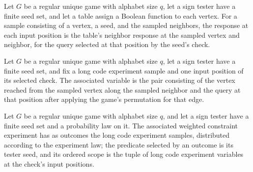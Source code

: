 \begin{definition}
\label{FABL.RegularUniqueGame.longCodeExperimentResponses}
\leanok
{}
Let $G$ be a regular unique game with alphabet size $q$, let a sign tester have a finite
seed set, and let a table assign a Boolean function to each vertex. For a sample
consisting of a vertex, a seed, and the sampled neighbors, the response at each input
position is the table's neighbor response at the sampled vertex and neighbor, for the
query selected at that position by the seed's check.
\end{definition}

\begin{definition}
\label{FABL.RegularUniqueGame.longCodeExperimentVariable}
\leanok
{}
Let $G$ be a regular unique game with alphabet size $q$, let a sign tester have a finite
seed set, and fix a long code experiment sample and one input position of its selected
check. The associated variable is the pair consisting of the vertex reached from the
sampled vertex along the sampled neighbor and the query at that position after applying
the game's permutation for that edge.
\end{definition}

\begin{definition}
\label{FABL.RegularUniqueGame.longCodeWeightedExperiment}
\leanok
{}
Let $G$ be a regular unique game with alphabet size $q$, and let a sign tester have a
finite seed set and a probability law on it. The associated weighted constraint
experiment has as outcomes the long code experiment samples, distributed according to
the experiment law; the predicate selected by an outcome is its tester seed, and its
ordered scope is the tuple of long code experiment variables at the check's input
positions.
\end{definition}

